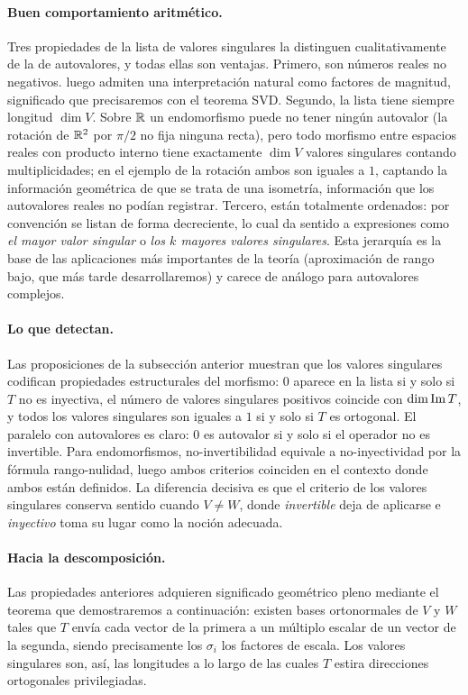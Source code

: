 \paragraph{Buen comportamiento aritmético.} Tres propiedades de la lista
de valores singulares la distinguen cualitativamente de la de autovalores,
y todas ellas son ventajas. Primero, son números reales no negativos.
luego admiten una interpretación natural como factores de magnitud, significado que precisaremos con el teorema SVD. Segundo, la lista tiene
siempre longitud $\dim V$. Sobre $\mathbb{R}$ un endomorfismo puede no tener ningún
autovalor (la rotación de $\mathbb{R}^2$ por $\pi/2$ no fija ninguna recta), pero
todo morfismo entre espacios reales con producto interno tiene exactamente
$\dim V$ valores singulares contando multiplicidades; en el ejemplo de la
rotación ambos son iguales a $1$, captando la información geométrica de
que se trata de una isometría, información que los autovalores reales no
podían registrar. Tercero, están totalmente ordenados: por convención se
listan de forma decreciente, lo cual da sentido a expresiones como
\emph{el mayor valor singular} o \emph{los $k$ mayores valores singulares}.
Esta jerarquía es la base de las aplicaciones más importantes de la
teoría (aproximación de rango bajo, que más tarde desarrollaremos) y carece de análogo para autovalores complejos.

\paragraph{Lo que detectan.} Las proposiciones de la subsección anterior
muestran que los valores singulares codifican propiedades estructurales
del morfismo: $0$ aparece en la lista si y solo si $T$ no es inyectiva,
el número de valores singulares positivos coincide con $\dim\operatorname{Im} T$, y
todos los valores singulares son iguales a $1$ si y solo si $T$ es
ortogonal. El paralelo con autovalores es claro: $0$ es autovalor si y
solo si el operador no es invertible. Para endomorfismos, no-invertibilidad
equivale a no-inyectividad por la fórmula rango-nulidad, luego ambos
criterios coinciden en el contexto donde ambos están definidos. La
diferencia decisiva es que el criterio de los valores singulares conserva
sentido cuando $V\neq W$, donde \emph{invertible} deja de aplicarse e
\emph{inyectivo} toma su lugar como la noción adecuada.

\paragraph{Hacia la descomposición.} Las propiedades anteriores adquieren
significado geométrico pleno mediante el teorema que demostraremos a
continuación: existen bases ortonormales de $V$ y $W$ tales que $T$ envía
cada vector de la primera a un múltiplo escalar de un vector de la segunda,
siendo precisamente los $\sigma_i$ los factores de escala. Los valores
singulares son, así, las longitudes a lo largo de las cuales $T$ estira
direcciones ortogonales privilegiadas.

